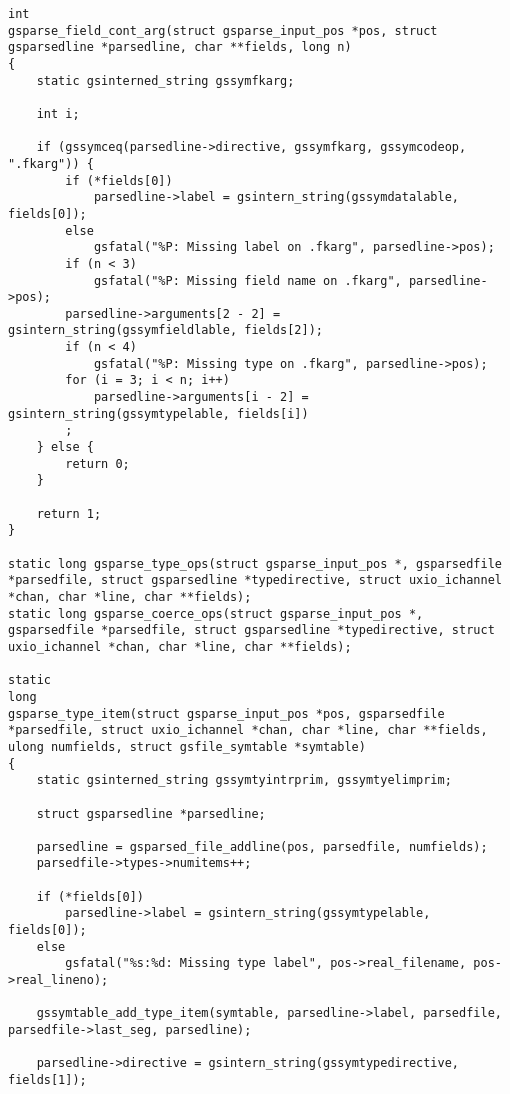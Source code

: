 \documentclass{report}
\begin{document}
\begin{verbatim}
int
gsparse_field_cont_arg(struct gsparse_input_pos *pos, struct gsparsedline *parsedline, char **fields, long n)
{
    static gsinterned_string gssymfkarg;

    int i;

    if (gssymceq(parsedline->directive, gssymfkarg, gssymcodeop, ".fkarg")) {
        if (*fields[0])
            parsedline->label = gsintern_string(gssymdatalable, fields[0]);
        else
            gsfatal("%P: Missing label on .fkarg", parsedline->pos);
        if (n < 3)
            gsfatal("%P: Missing field name on .fkarg", parsedline->pos);
        parsedline->arguments[2 - 2] = gsintern_string(gssymfieldlable, fields[2]);
        if (n < 4)
            gsfatal("%P: Missing type on .fkarg", parsedline->pos);
        for (i = 3; i < n; i++)
            parsedline->arguments[i - 2] = gsintern_string(gssymtypelable, fields[i])
        ;
    } else {
        return 0;
    }

    return 1;
}

static long gsparse_type_ops(struct gsparse_input_pos *, gsparsedfile *parsedfile, struct gsparsedline *typedirective, struct uxio_ichannel *chan, char *line, char **fields);
static long gsparse_coerce_ops(struct gsparse_input_pos *, gsparsedfile *parsedfile, struct gsparsedline *typedirective, struct uxio_ichannel *chan, char *line, char **fields);

static
long
gsparse_type_item(struct gsparse_input_pos *pos, gsparsedfile *parsedfile, struct uxio_ichannel *chan, char *line, char **fields, ulong numfields, struct gsfile_symtable *symtable)
{
    static gsinterned_string gssymtyintrprim, gssymtyelimprim;

    struct gsparsedline *parsedline;

    parsedline = gsparsed_file_addline(pos, parsedfile, numfields);
    parsedfile->types->numitems++;

    if (*fields[0])
        parsedline->label = gsintern_string(gssymtypelable, fields[0]);
    else
        gsfatal("%s:%d: Missing type label", pos->real_filename, pos->real_lineno);

    gssymtable_add_type_item(symtable, parsedline->label, parsedfile, parsedfile->last_seg, parsedline);

    parsedline->directive = gsintern_string(gssymtypedirective, fields[1]);


\end{verbatim}
\end{document}
